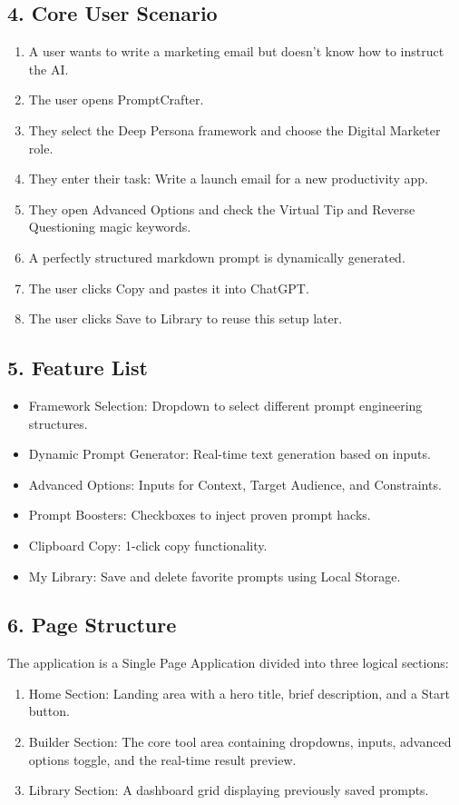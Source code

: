 \documentclass[11pt]{article}
\begin{document}
\subsection*{4. Core User Scenario}
\begin{enumerate}[noitemsep]
    \item A user wants to write a marketing email but doesn't know how to instruct the AI.
    \item The user opens PromptCrafter.
    \item They select the Deep Persona framework and choose the Digital Marketer role.
    \item They enter their task: Write a launch email for a new productivity app.
    \item They open Advanced Options and check the Virtual Tip and Reverse Questioning magic keywords.
    \item A perfectly structured markdown prompt is dynamically generated.
    \item The user clicks Copy and pastes it into ChatGPT.
    \item The user clicks Save to Library to reuse this setup later.
\end{enumerate}

\subsection*{5. Feature List}
\begin{itemize}[noitemsep]
    \item Framework Selection: Dropdown to select different prompt engineering structures.
    \item Dynamic Prompt Generator: Real-time text generation based on inputs.
    \item Advanced Options: Inputs for Context, Target Audience, and Constraints.
    \item Prompt Boosters: Checkboxes to inject proven prompt hacks.
    \item Clipboard Copy: 1-click copy functionality.
    \item My Library: Save and delete favorite prompts using Local Storage.
\end{itemize}

\subsection*{6. Page Structure}
The application is a Single Page Application divided into three logical sections:
\begin{enumerate}[noitemsep]
    \item Home Section: Landing area with a hero title, brief description, and a Start button.
    \item Builder Section: The core tool area containing dropdowns, inputs, advanced options toggle, and the real-time result preview.
    \item Library Section: A dashboard grid displaying previously saved prompts.
\end{enumerate}
\end{document}

